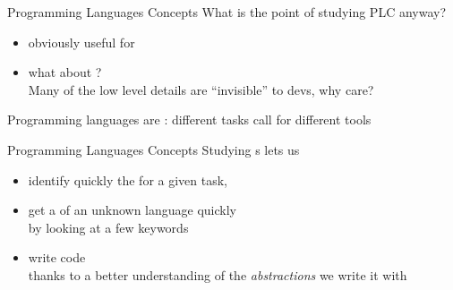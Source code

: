 \documentclass[10pt]{beamer}
\begin{document}
\begin{frame}{Programming Languages Concepts}
  What is the point of studying PLC anyway?
  \medskip
  \begin{itemize}
    \item obviously useful for 
    \item what about ? \\
      Many of the low level details are ``invisible'' to devs, why care?
  \end{itemize}
  \bigskip
  \pause

  Programming languages are :
  different tasks call for different tools
\end{frame}



\begin{frame}{Programming Languages Concepts}
  Studying s lets us
  \medskip
  \begin{itemize}\bigsep
    \item identify quickly the  for a given task,
    \item get a  of an unknown language quickly \\
      by looking at a few keywords
    \item write  code \\
      thanks to a better understanding of
      the \emph{abstractions} we write it with
  \end{itemize}
\end{frame}
\end{document}
